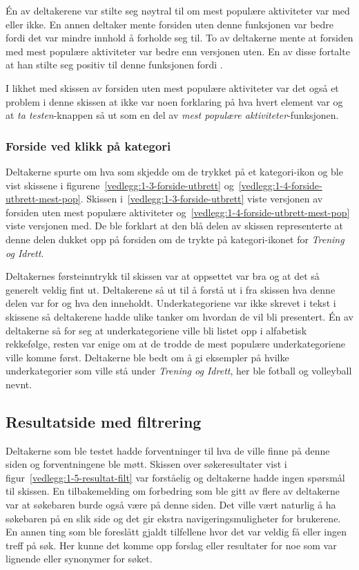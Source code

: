 Én av deltakerene var stilte seg nøytral til om mest populære aktiviteter var med eller ikke. En annen deltaker mente forsiden uten denne funksjonen var bedre fordi det var mindre innhold å forholde seg til. To av deltakerne mente at forsiden med mest populære aktiviteter var bedre enn versjonen uten. En av disse fortalte at han stilte seg positiv til denne funksjonen fordi .

I likhet med skissen av forsiden uten mest populære aktiviteter var det også et problem i denne skissen at ikke var noen forklaring på hva hvert element var og at {\em ta testen}-knappen så ut som en del av {\em mest populære aktiviteter}-funksjonen. 

\subsubsection{Forside ved klikk på kategori}
Deltakerne spurte om hva som skjedde om de trykket på et kategori-ikon og ble vist skissene i figurene~\ref{vedlegg:1-3-forside-utbrett} og~\ref{vedlegg:1-4-forside-utbrett-mest-pop}. Skissen i~\ref{vedlegg:1-3-forside-utbrett} viste versjonen av forsiden uten mest populære aktiviteter og~\ref{vedlegg:1-4-forside-utbrett-mest-pop} viste versjonen med. De ble forklart at den blå delen av skissen representerte at denne delen dukket opp på forsiden om de trykte på kategori-ikonet for {\em Trening og Idrett}.

Deltakernes førsteinntrykk til skissen var at oppsettet var bra og at det så generelt veldig fint ut. Deltakerene så ut til å forstå ut i fra skissen hva denne delen var for og hva den inneholdt. Underkategoriene var ikke skrevet i tekst i skissene så deltakerene hadde ulike tanker om hvordan de vil bli presentert. Én av deltakerne så for seg at underkategoriene ville bli listet opp i alfabetisk rekkefølge, resten var enige om at de trodde de mest populære underkategoriene ville komme først. Deltakerne ble bedt om å gi eksempler på hvilke underkategorier som ville stå under {\em Trening og Idrett}, her ble fotball og volleyball nevnt.

\subsection{Resultatside med filtrering}

Deltakerne som ble testet hadde forventninger til hva de ville finne på denne siden og forventningene ble møtt. 
Skissen over søkeresultater vist i figur~\ref{vedlegg:1-5-resultat-filt} var forståelig og deltakerne hadde ingen spørsmål til skissen.
En tilbakemelding om forbedring som ble gitt av flere av deltakerne var at søkebaren burde også være på denne siden. Det ville vært naturlig å ha søkebaren på en slik side og det gir ekstra navigeringsmuligheter for brukerene. En annen ting som ble foreslått gjaldt tilfellene hvor det var veldig få eller ingen treff på søk. Her kunne det komme opp forslag eller resultater for noe som var lignende eller synonymer for søket.



